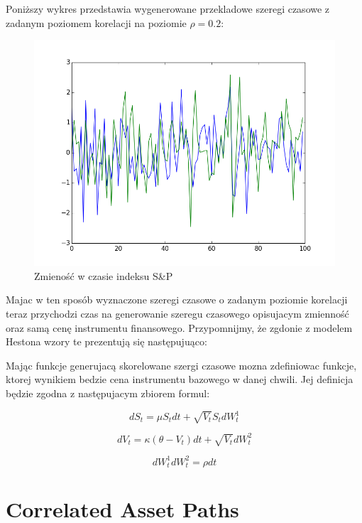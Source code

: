 \documentclass{pracamgr}
\begin{document}
Poniższy wykres przedstawia wygenerowane przekladowe szeregi czasowe z zadanym poziomem korelacji na poziomie $\rho = 0.2$:

\begin{figure}
  \centering
  \includegraphics[width=150mm]{corr.png}
  \caption{Zmieność w czasie indeksu S\&P}\label{fig:vix}
\end{figure}

Majac w ten sposób wyznaczone szeregi czasowe o zadanym poziomie korelacji teraz przychodzi czas na generowanie szeregu czasowego opisujacym zmienność oraz samą cenę instrumentu finansowego. 
Przypomnijmy, że zgdonie z modelem Hestona wzory te prezentują się następujuąco:

Mając funkcje generujacą skorelowane szergi czasowe mozna zdefiniowac funkcje, ktorej wynikiem bedzie cena instrumentu bazowego w danej chwili. Jej definicja będzie zgodna z następujacym zbiorem formul: \cite{OptimalInvestment2010}

\begin{equation}
dS_t =  \mu S_t  dt + \sqrt{V_t}S_t dW_t^1
\end{equation}

\begin{equation}
dV_t =  \kappa (\theta - V_t)  dt + \sqrt{V_t} dW_t^2
\end{equation}

\begin{equation}
dW_t^1 dW_t^2  = \rho dt
\end{equation}



\section{Correlated Asset Paths} %
\label{sec:CorrelatedAssetPaths}
\end{document}
